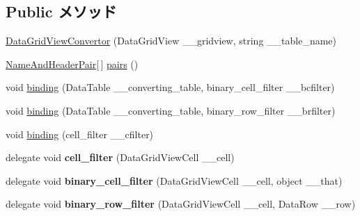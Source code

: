 \subsection*{Public メソッド}
\begin{DoxyCompactItemize}
\item 
\hyperlink{classlazurite_1_1etherial_1_1_data_grid_view_convertor_a9357a674989a205c57f5ffe3e3da75f1}{DataGridViewConvertor} (DataGridView \_\-\_\-gridview, string \_\-\_\-table\_\-name)
\item 
\hyperlink{classlazurite_1_1etherial_1_1_data_grid_view_convertor_1_1_name_and_header_pair}{NameAndHeaderPair}\mbox{[}$\,$\mbox{]} \hyperlink{classlazurite_1_1etherial_1_1_data_grid_view_convertor_ac7d685e90bd9935c1abf22bffe101c9a}{pairs} ()
\item 
void \hyperlink{classlazurite_1_1etherial_1_1_data_grid_view_convertor_a352bd8d95aa50eadf6f3a54c9fe8115c}{binding} (DataTable \_\-\_\-converting\_\-table, binary\_\-cell\_\-filter \_\-\_\-bcfilter)
\item 
void \hyperlink{classlazurite_1_1etherial_1_1_data_grid_view_convertor_a158ef6d9f8296448e225e73198431050}{binding} (DataTable \_\-\_\-converting\_\-table, binary\_\-row\_\-filter \_\-\_\-brfilter)
\item 
void \hyperlink{classlazurite_1_1etherial_1_1_data_grid_view_convertor_ad89359a56e56dde1ca1f85e7fb3e61bd}{binding} (cell\_\-filter \_\-\_\-cfilter)
\item 
\hypertarget{classlazurite_1_1etherial_1_1_data_grid_view_convertor_a4d34d19a4c539d712004ae5e0a265021}{
delegate void {\bfseries cell\_\-filter} (DataGridViewCell \_\-\_\-cell)}
\label{classlazurite_1_1etherial_1_1_data_grid_view_convertor_a4d34d19a4c539d712004ae5e0a265021}

\item 
\hypertarget{classlazurite_1_1etherial_1_1_data_grid_view_convertor_a7364e3af7ed80e698c70d2bd34f7ae37}{
delegate void {\bfseries binary\_\-cell\_\-filter} (DataGridViewCell \_\-\_\-cell, object \_\-\_\-that)}
\label{classlazurite_1_1etherial_1_1_data_grid_view_convertor_a7364e3af7ed80e698c70d2bd34f7ae37}

\item 
\hypertarget{classlazurite_1_1etherial_1_1_data_grid_view_convertor_adc3107229b0253df3a11bf6a05112819}{
delegate void {\bfseries binary\_\-row\_\-filter} (DataGridViewCell \_\-\_\-cell, DataRow \_\-\_\-row)}
\label{classlazurite_1_1etherial_1_1_data_grid_view_convertor_adc3107229b0253df3a11bf6a05112819}

\end{DoxyCompactItemize}


